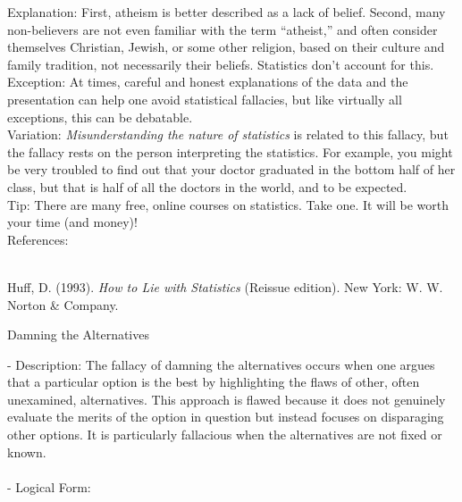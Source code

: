 \documentclass[a4paper,12pt,single,pdftex]{scrbook}
\begin{document}
    
      Explanation: First, atheism is better described as a lack of belief.  Second, many non-believers are not even familiar with the term “atheist,” and often consider themselves Christian, Jewish, or some other religion, based on their culture and family tradition, not necessarily their beliefs.  Statistics don’t account for this.
    \\

    
      Exception: At times, careful and honest explanations of the data and the presentation can help one avoid statistical fallacies, but like virtually all exceptions, this can be debatable.
    \\

    
      Variation: {\it Misunderstanding the nature of statistics} is related to this fallacy, but the fallacy rests on the person interpreting the statistics.  For example, you might be very troubled to find out that your doctor graduated in the bottom half of her class, but that is half of all the doctors in the world, and to be expected.
    \\

    
      Tip: There are many free, online courses on statistics. Take one. It will be worth your time (and money)!
    \\

    References:

    
      
        
      \\

      
        
          Huff, D. (1993). {\it How to Lie with Statistics} (Reissue edition). New York: W. W. Norton \& Company.
        
      
    
  

Damning the Alternatives
    
      - Description: The fallacy of damning the alternatives occurs when one argues that a particular option is the best by highlighting the flaws of other, often unexamined, alternatives. This approach is flawed because it does not genuinely evaluate the merits of the option in question but instead focuses on disparaging other options. It is particularly fallacious when the alternatives are not fixed or known.
    \\

    
      
    \\

    
      - Logical Form:
    \\
\end{document}
